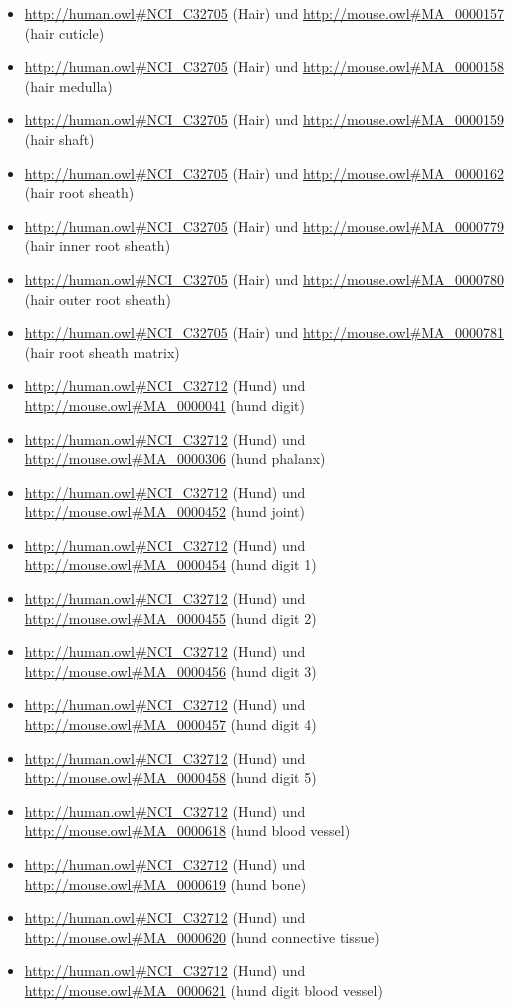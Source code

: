 \begin{itemize}
	\item \url{http://human.owl#NCI_C32705} (Hair) und \url{http://mouse.owl#MA_0000157} (hair cuticle)
	\item \url{http://human.owl#NCI_C32705} (Hair) und \url{http://mouse.owl#MA_0000158} (hair medulla)
	\item \url{http://human.owl#NCI_C32705} (Hair) und \url{http://mouse.owl#MA_0000159} (hair shaft)
	\item \url{http://human.owl#NCI_C32705} (Hair) und \url{http://mouse.owl#MA_0000162} (hair root sheath)
	\item \url{http://human.owl#NCI_C32705} (Hair) und \url{http://mouse.owl#MA_0000779} (hair inner root sheath)
	\item \url{http://human.owl#NCI_C32705} (Hair) und \url{http://mouse.owl#MA_0000780} (hair outer root sheath)
	\item \url{http://human.owl#NCI_C32705} (Hair) und \url{http://mouse.owl#MA_0000781} (hair root sheath matrix)
	\item \url{http://human.owl#NCI_C32712} (Hund) und \url{http://mouse.owl#MA_0000041} (hund digit)
	\item \url{http://human.owl#NCI_C32712} (Hund) und \url{http://mouse.owl#MA_0000306} (hund phalanx)
	\item \url{http://human.owl#NCI_C32712} (Hund) und \url{http://mouse.owl#MA_0000452} (hund joint)
	\item \url{http://human.owl#NCI_C32712} (Hund) und \url{http://mouse.owl#MA_0000454} (hund digit 1)
	\item \url{http://human.owl#NCI_C32712} (Hund) und \url{http://mouse.owl#MA_0000455} (hund digit 2)
	\item \url{http://human.owl#NCI_C32712} (Hund) und \url{http://mouse.owl#MA_0000456} (hund digit 3)
	\item \url{http://human.owl#NCI_C32712} (Hund) und \url{http://mouse.owl#MA_0000457} (hund digit 4)
	\item \url{http://human.owl#NCI_C32712} (Hund) und \url{http://mouse.owl#MA_0000458} (hund digit 5)
	\item \url{http://human.owl#NCI_C32712} (Hund) und \url{http://mouse.owl#MA_0000618} (hund blood vessel)
	\item \url{http://human.owl#NCI_C32712} (Hund) und \url{http://mouse.owl#MA_0000619} (hund bone)
	\item \url{http://human.owl#NCI_C32712} (Hund) und \url{http://mouse.owl#MA_0000620} (hund connective tissue)
	\item \url{http://human.owl#NCI_C32712} (Hund) und \url{http://mouse.owl#MA_0000621} (hund digit blood vessel)

\end{itemize}
